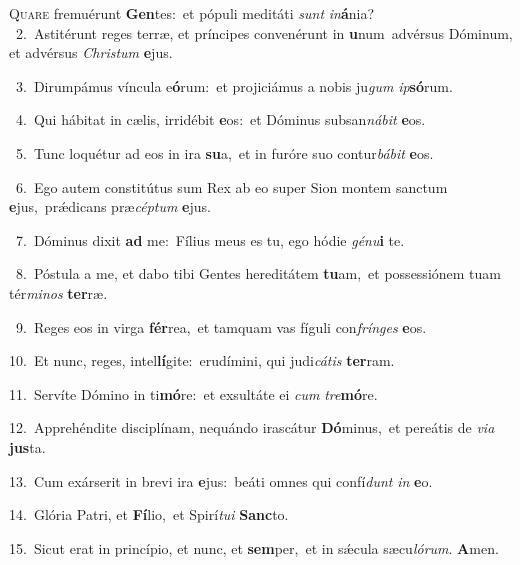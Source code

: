\lettrine{\initial\textcolor{\initialcolor}{Q}}{uare} fremuérunt \textbf{Gen}\-tes:~\star et pópuli meditáti \textit{sunt} \textit{in}\-\textbf{á}nia?\\
{\numbfont\textcolor{\numbcolor}{~2.}}~Astitérunt reges terræ, et príncipes convenérunt in \textbf{u}\-num~\star advérsus Dóminum, et advérsus \textit{Chris}\-\textit{tum} \textbf{e}\-jus.\par
{\numbfont\textcolor{\numbcolor}{~3.}}~Dirumpámus víncula e\-\textbf{ó}\-rum:~\star et projiciámus a nobis ju\textit{gum} \textit{ip}\-\textbf{só}rum.\par
{\numbfont\textcolor{\numbcolor}{~4.}}~Qui hábitat in cælis, irridébit \textbf{e}\-os:~\star et Dóminus subsan\-\textit{ná}\-\textit{bit} \textbf{e}\-os.\par
{\numbfont\textcolor{\numbcolor}{~5.}}~Tunc loquétur ad eos in ira \textbf{su}\-a,~\star et in furóre suo contur\-\textit{bá}\-\textit{bit} \textbf{e}\-os.\par
{\numbfont\textcolor{\numbcolor}{~6.}}~Ego autem constitútus sum Rex ab eo super Sion montem sanctum \textbf{e}\-jus,~\star prǽdicans præ\-\textit{cép}\-\textit{tum} \textbf{e}\-jus.\par
{\numbfont\textcolor{\numbcolor}{~7.}}~Dóminus dixit \textbf{ad} me:~\star Fílius meus es tu, ego hódie \textit{gé}\-\textit{nu}\textbf{i} te.\par
{\numbfont\textcolor{\numbcolor}{~8.}}~Póstula a me, et dabo tibi Gentes hereditátem \textbf{tu}\-am,~\star et possessiónem tuam tér\-\textit{mi}\-\textit{nos} \textbf{ter}\-ræ.\par
{\numbfont\textcolor{\numbcolor}{~9.}}~Reges eos in virga \textbf{fér}\-rea,~\star et tamquam vas fíguli con\-\textit{frín}\-\textit{ges} \textbf{e}\-os.\par
{\numbfont\textcolor{\numbcolor}{10.}}~Et nunc, reges, intel\-\textbf{lí}\-gite:~\star erudímini, qui judi\-\textit{cá}\-\textit{tis} \textbf{ter}\-ram.\par
{\numbfont\textcolor{\numbcolor}{11.}}~Servíte Dómino in ti\-\textbf{mó}\-re:~\star et exsultáte ei \textit{cum} \textit{tre}\-\textbf{mó}re.\par
{\numbfont\textcolor{\numbcolor}{12.}}~Apprehéndite disciplínam, nequándo irascátur \textbf{Dó}\-minus,~\star et pereátis de \textit{vi}\-\textit{a} \textbf{jus}\-ta.\par
{\numbfont\textcolor{\numbcolor}{13.}}~Cum exárserit in brevi ira \textbf{e}\-jus:~\star beáti omnes qui confí\textit{dunt} \textit{in} \textbf{e}\-o.\par
{\numbfont\textcolor{\numbcolor}{14.}}~Glória Patri, et \textbf{Fí}\-lio,~\star et Spirí\-\textit{tu}\-\textit{i} \textbf{Sanc}\-to.\par
{\numbfont\textcolor{\numbcolor}{15.}}~Sicut erat in princípio, et nunc, et \textbf{sem}\-per,~\star et in sǽcula sæcu\-\textit{ló}\-\textit{rum}. \textbf{A}\-men.\par
